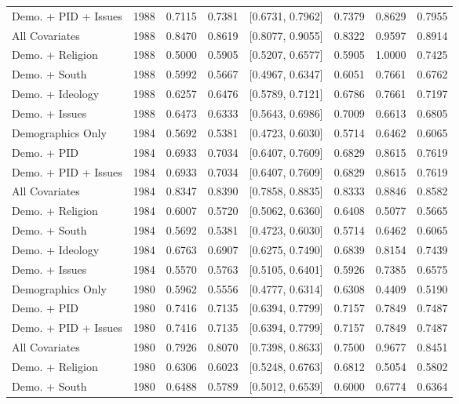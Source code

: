 \begin{longtable}{lrrrlrrr}
  Demo. + PID + Issues & 1988 & 0.7115 & 0.7381 & [0.6731, 0.7962] & 0.7379 & 0.8629 & 0.7955 \\ 
  All Covariates & 1988 & 0.8470 & 0.8619 & [0.8077, 0.9055] & 0.8322 & 0.9597 & 0.8914 \\ 
  Demo. + Religion & 1988 & 0.5000 & 0.5905 & [0.5207, 0.6577] & 0.5905 & 1.0000 & 0.7425 \\ 
  Demo. + South & 1988 & 0.5992 & 0.5667 & [0.4967, 0.6347] & 0.6051 & 0.7661 & 0.6762 \\ 
  Demo. + Ideology & 1988 & 0.6257 & 0.6476 & [0.5789, 0.7121] & 0.6786 & 0.7661 & 0.7197 \\ 
  Demo. + Issues & 1988 & 0.6473 & 0.6333 & [0.5643, 0.6986] & 0.7009 & 0.6613 & 0.6805 \\ 
  Demographics Only & 1984 & 0.5692 & 0.5381 & [0.4723, 0.6030] & 0.5714 & 0.6462 & 0.6065 \\ 
  Demo. + PID & 1984 & 0.6933 & 0.7034 & [0.6407, 0.7609] & 0.6829 & 0.8615 & 0.7619 \\ 
  Demo. + PID + Issues & 1984 & 0.6933 & 0.7034 & [0.6407, 0.7609] & 0.6829 & 0.8615 & 0.7619 \\ 
  All Covariates & 1984 & 0.8347 & 0.8390 & [0.7858, 0.8835] & 0.8333 & 0.8846 & 0.8582 \\ 
  Demo. + Religion & 1984 & 0.6007 & 0.5720 & [0.5062, 0.6360] & 0.6408 & 0.5077 & 0.5665 \\ 
  Demo. + South & 1984 & 0.5692 & 0.5381 & [0.4723, 0.6030] & 0.5714 & 0.6462 & 0.6065 \\ 
  Demo. + Ideology & 1984 & 0.6763 & 0.6907 & [0.6275, 0.7490] & 0.6839 & 0.8154 & 0.7439 \\ 
  Demo. + Issues & 1984 & 0.5570 & 0.5763 & [0.5105, 0.6401] & 0.5926 & 0.7385 & 0.6575 \\ 
  Demographics Only & 1980 & 0.5962 & 0.5556 & [0.4777, 0.6314] & 0.6308 & 0.4409 & 0.5190 \\ 
  Demo. + PID & 1980 & 0.7416 & 0.7135 & [0.6394, 0.7799] & 0.7157 & 0.7849 & 0.7487 \\ 
  Demo. + PID + Issues & 1980 & 0.7416 & 0.7135 & [0.6394, 0.7799] & 0.7157 & 0.7849 & 0.7487 \\ 
  All Covariates & 1980 & 0.7926 & 0.8070 & [0.7398, 0.8633] & 0.7500 & 0.9677 & 0.8451 \\ 
  Demo. + Religion & 1980 & 0.6306 & 0.6023 & [0.5248, 0.6763] & 0.6812 & 0.5054 & 0.5802 \\ 
  Demo. + South & 1980 & 0.6488 & 0.5789 & [0.5012, 0.6539] & 0.6000 & 0.6774 & 0.6364 \\ 

\end{longtable}
